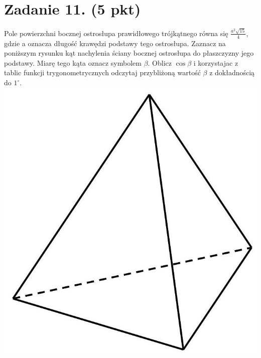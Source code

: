 \documentclass[10pt]{article}
\begin{document}
\section*{Zadanie 11. (5 pkt)}
Pole powierzchni bocznej ostrosłupa prawidłowego trójkątnego równa się \(\frac{a^{2} \sqrt{15}}{4}\), gdzie a oznacza długość krawędzi podstawy tego ostrosłupa. Zaznacz na poniższym rysunku kąt nachylenia ściany bocznej ostrosłupa do płaszczyzny jego podstawy. Miarę tego kąta oznacz symbolem \(\beta\). Oblicz \(\cos \beta\) i korzystajac z tablic funkcji trygonometrycznych odczytaj przybliżoną wartość \(\beta\) z dokładnością do \(1^{\circ}\).\\
\includegraphics[max width=\textwidth, center]{2024_11_21_2f72fc0c2faed8928619g-16(5)}
\end{document}
